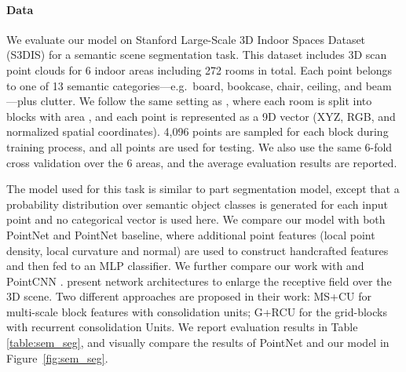\documentclass[acmtog]{acmart}
\begin{document}
\paragraph{Data} 
We evaluate our model on Stanford Large-Scale 3D Indoor Spaces Dataset (S3DIS) \cite{armeni_cvpr16} for a semantic scene segmentation task.
This dataset includes 3D scan point clouds for 6 indoor areas including 272 rooms in total. 
Each point belongs to one of 13 semantic categories---e.g.\ board, bookcase, chair, ceiling, and beam---plus clutter.
We follow the same setting as \citet{DBLP:journals/corr/QiSMG16}, where each room is split into blocks with area , and each point is represented as a 9D vector (XYZ, RGB, and normalized spatial coordinates).
4,096 points are sampled for each block during training process, and all points are used for testing.
We also use the same 6-fold cross validation over the 6 areas, and the average evaluation results are reported.

The model used for this task is similar to part segmentation model, except that a probability distribution over semantic object classes is generated for each input point and no categorical vector is used here. 
We compare our model with both PointNet \cite{DBLP:journals/corr/QiSMG16} and PointNet baseline, where additional point features (local point density, local curvature and normal) are used to construct handcrafted features and then fed to an MLP classifier. 
We further compare our work with \cite{engelmann2017exploring} and PointCNN \cite{pointcnn}. \citet{engelmann2017exploring} present network architectures to enlarge the receptive field over the 3D scene. 
Two different approaches are proposed in their work: MS+CU for multi-scale block features with consolidation units; G+RCU for the grid-blocks with recurrent consolidation Units. 
We report evaluation results in Table \ref{table:sem_seg}, and visually compare the results of PointNet and our model in Figure~\ref{fig:sem_seg}.
\end{document}
